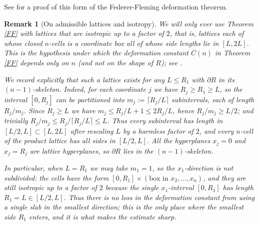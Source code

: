 \documentclass{amsart}
\newtheorem*{theorem 1}{Theorem 1}
\newtheorem*{theorem 2}{Theorem 2}
\newtheorem*{theorem 3}{Theorem 3}
\newtheorem{remark}{Remark}
\numberwithin{equation}{section}
\begin{document}
See \cite{G3} for a proof of this form of the Federer-Fleming deformation theorem.  

\begin{remark}[On admissible lattices and isotropy] \label{rem:lattice}
We will only ever use Theorem \ref{FF} with lattices that are
\emph{isotropic up to a factor of $2$}, that is, lattices each of
whose closed $n$-cells is a coordinate box all of whose side
lengths lie in $[L,2L]$.  This is the hypothesis under which the
deformation constant $C(n)$ in Theorem \ref{FF} depends only on
$n$ (and not on the shape of $R$); see \cite{G3}.

We record explicitly that such a lattice exists for any
$L \le R_1$ with $\partial R$ in its $(n-1)$-skeleton.  Indeed, for
each coordinate $j$ we have $R_j \ge R_1 \ge L$, so the interval
$[0,R_j]$ can be partitioned into $m_j := \lceil R_j / L\rceil$
subintervals, each of length $R_j/m_j$.  Since $R_j \ge L$ we have
$m_j \le R_j/L + 1 \le 2 R_j / L$, hence
$R_j/m_j \ge L/2$; and trivially $R_j/m_j \le R_j/\lceil R_j/L
\rceil \le L$.  Thus every subinterval has length in $[L/2,L]
\subset [L,2L]$ after rescaling $L$ by a harmless factor of $2$,
and every $n$-cell of the product lattice has all sides in
$[L/2,L]$.  All the hyperplanes $x_j = 0$ and $x_j = R_j$ are
lattice hyperplanes, so $\partial R$ lies in the
$(n-1)$-skeleton.

In particular, when $L = R_1$ we may take $m_1 = 1$, so the
$x_1$-direction is \emph{not} subdivided: the cells have the form
$[0,R_1] \times (\text{box in } x_2,\dots,x_n)$, and they are
still isotropic up to a factor of $2$ because the single
$x_1$-interval $[0,R_1]$ has length $R_1 = L \in [L/2,L]$.  Thus
there is no loss in the deformation constant from using a single
slab in the smallest direction; this is the only place where the
\emph{smallest} side $R_1$ enters, and it is what makes the
estimate sharp.
\end{remark}
\end{document}
